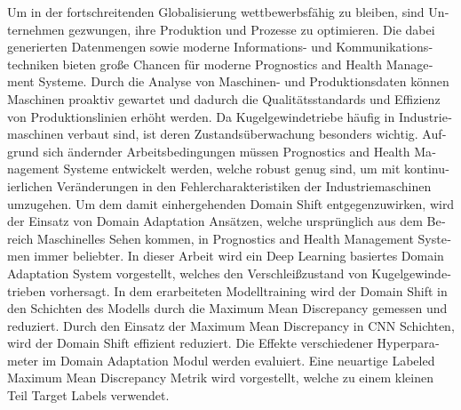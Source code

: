 \begin{otherlanguage}{ngerman} %
Um in der fortschreitenden Globalisierung wettbewerbsfähig zu bleiben, sind Unternehmen gezwungen, ihre Produktion und Prozesse zu optimieren. Die dabei generierten Datenmengen sowie moderne Informations- und Kommunikationstechniken bieten große Chancen für moderne Prognostics and Health Management Systeme. Durch die Analyse von Maschinen- und Produktionsdaten können Maschinen proaktiv gewartet und dadurch die Qualitätsstandards und Effizienz von Produktionslinien erhöht werden. Da Kugelgewindetriebe häufig in Industriemaschinen verbaut sind, ist deren Zustandsüberwachung besonders wichtig. Aufgrund sich ändernder Arbeitsbedingungen müssen Prognostics and Health Management Systeme entwickelt werden, welche robust genug sind, um mit kontinuierlichen Veränderungen in den Fehlercharakteristiken der Industriemaschinen umzugehen. Um dem damit einhergehenden Domain Shift entgegenzuwirken, wird der Einsatz von Domain Adaptation Ansätzen, welche ursprünglich aus dem Bereich Maschinelles Sehen kommen, in Prognostics and Health Management Systemen immer beliebter. In dieser Arbeit wird ein Deep Learning basiertes Domain Adaptation System vorgestellt, welches den Verschleißzustand von Kugelgewindetrieben vorhersagt. In dem erarbeiteten Modelltraining wird der Domain Shift in den Schichten des Modells durch die Maximum Mean Discrepancy gemessen und reduziert. Durch den Einsatz der Maximum Mean Discrepancy in CNN Schichten, wird der Domain Shift effizient reduziert. Die Effekte verschiedener Hyperparameter im Domain Adaptation Modul werden evaluiert. Eine neuartige Labeled Maximum Mean Discrepancy Metrik wird vorgestellt, welche zu einem kleinen Teil Target Labels verwendet.



\end{otherlanguage}


\makeatletter
{}
{\renewcommand{\abstractname}{Abstract}}
{\renewcommand{\abstractname}{Kurzfassung}}
\makeatother